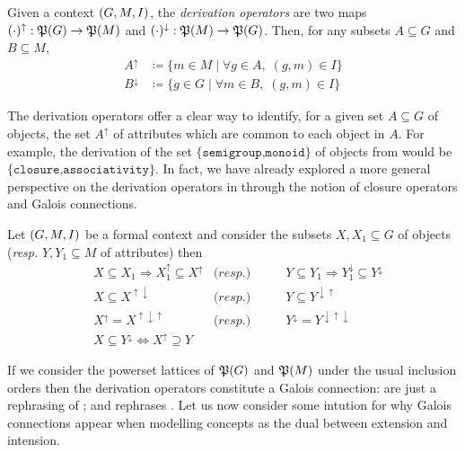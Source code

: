 \begin{definition}
     \label{definition:derivation-operators} 
  Given a context $(G,M,\mathrel{I})$, the \textit{derivation operators} are two maps $(\cdot)^\uparrow : \mathfrak{P}({G}) \to \mathfrak{P}({M})$ and $(\cdot)^\downarrow : \mathfrak{P}({M}) \to \mathfrak{P}({G})$. Then, for any subsets $A \subseteq G$ and $B \subseteq M$,
  \begin{align*}
       A^\uparrow & \coloneqq \{m \in M \mid \forall g \in A, \; (g,m) \in I\} \\
       B^\downarrow & \coloneqq \{g \in G \mid \forall m \in B, \; (g,m) \in I\}
  \end{align*}
\end{definition}

The derivation operators offer a clear way to identify, for a given set $A \subseteq G$ of objects, the set $A^\uparrow$ of attributes which are common to each object in $A$. For example, the derivation of the set $\{\texttt{semigroup,monoid}\}$ of objects from  would be $\{\texttt{closure,associativity}\}$. In fact, we have already explored a more general perspective on the derivation operators in  through the notion of closure operators and Galois connections.

\begin{proposition}
\label{proposition:derivation-operators-galois}
Let $(G,M,\mathrel{I})$ be a formal context and consider the subsets $X,X_1 \subseteq G$ of objects (\textit{resp.} $Y,Y_1 \subseteq M$ of attributes) then
\begin{align}
    & X \subseteq X_1 \Rightarrow X_1^\uparrow \subseteq X^\uparrow & \textit{(resp.)} & \qquad Y \subseteq Y_1 \Rightarrow Y_1^\downarrow \subseteq Y^\downarrow \label{equation:galois-1} \\
    & X \subseteq X^{\uparrow \downarrow} & \textit{(resp.)} & \qquad Y \subseteq Y^{\downarrow \uparrow} \label{equation:galois-2} \\
    & X^\uparrow = X^{\uparrow \downarrow \uparrow}  & \textit{(resp.)} & \qquad  Y^\downarrow = Y^{\downarrow \uparrow \downarrow} \label{equation:galois-3} \\
    & X \subseteq Y^\downarrow \Longleftrightarrow X^\uparrow \supseteq Y & \label{equation:galois-4}
\end{align}
\end{proposition}

If we consider the powerset lattices of $\mathfrak{P}({G})$ and $\mathfrak{P}({M})$ under the usual inclusion orders then the derivation operators constitute a Galois connection:  are just a  rephrasing of ; and  rephrases . Let us now consider some intution for why Galois connections appear when modelling concepts as the dual between extension and intension.

